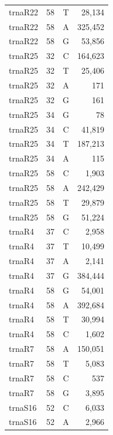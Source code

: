 \documentclass[12pt]{rockefeller}
\begin{document}
\begin{tiny}
\begin{longtable}{|l|r|c|r|}
 trnaR22 &        58 &          T &     28,134 \\
 trnaR22 &        58 &          A &    325,452 \\
 trnaR22 &        58 &          G &     53,856 \\
 trnaR25 &        32 &          C &    164,623 \\
 trnaR25 &        32 &          T &     25,406 \\
 trnaR25 &        32 &          A &        171 \\
 trnaR25 &        32 &          G &        161 \\
 trnaR25 &        34 &          G &         78 \\
 trnaR25 &        34 &          C &     41,819 \\
 trnaR25 &        34 &          T &    187,213 \\
 trnaR25 &        34 &          A &        115 \\
 trnaR25 &        58 &          C &      1,903 \\
 trnaR25 &        58 &          A &    242,429 \\
 trnaR25 &        58 &          T &     29,879 \\
 trnaR25 &        58 &          G &     51,224 \\
  trnaR4 &        37 &          C &      2,958 \\
  trnaR4 &        37 &          T &     10,499 \\
  trnaR4 &        37 &          A &      2,141 \\
  trnaR4 &        37 &          G &    384,444 \\
  trnaR4 &        58 &          G &     54,001 \\
  trnaR4 &        58 &          A &    392,684 \\
  trnaR4 &        58 &          T &     30,994 \\
  trnaR4 &        58 &          C &      1,602 \\
  trnaR7 &        58 &          A &    150,051 \\
  trnaR7 &        58 &          T &      5,083 \\
  trnaR7 &        58 &          C &        537 \\
  trnaR7 &        58 &          G &      3,895 \\
 trnaS16 &        52 &          C &      6,033 \\
 trnaS16 &        52 &          A &      2,966 \\

\end{longtable}
\end{tiny}
\end{document}
